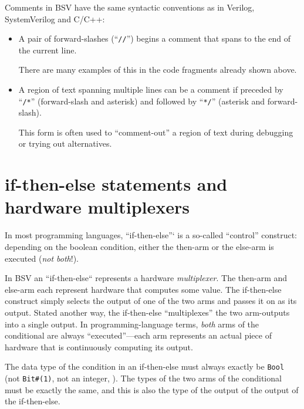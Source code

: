 Comments in BSV have the same syntactic conventions as in Verilog,
SystemVerilog and C/C++:

\begin{itemize}

  \item A pair of forward-slashes (``\verb|//|'') begins a comment
    that spans to the end of the current line.

    There are many examples of this in the code fragments already
    shown above.

  \item A region of text spanning multiple lines can be a comment if
    preceded by ``\verb|/*|'' (forward-slash and asterisk) and followed by
    ``\verb|*/|'' (asterisk and forward-slash).

    This form is often used to ``comment-out'' a region of text during
    debugging or trying out alternatives.

\end{itemize}


\section{if-then-else statements and hardware multiplexers}

\label{BSV_Combo_Circuits_if_then_else}


In most programming languages, ``if-then-else''` is a so-called
``control'' construct: depending on the boolean condition, either the
then-arm or the else-arm is executed (\emph{not both}!).

In BSV an ``if-then-else`` represents a hardware \emph{multiplexer}.
The then-arm and else-arm each represent hardware that computes some
value.  The if-then-else construct simply selects the output of one of
the two arms and passes it on as its output.  Stated another way, the
if-then-else ``multiplexes'' the two arm-outputs into a single output.
In programming-language terms, \emph{both} arms of the conditional are
always ``executed''---each arm represents an actual piece of hardware
that is continuously computing its output.

The data type of the condition in an if-then-else must always exactly
be \verb|Bool| (not \verb|Bit#(1)|, not an integer, {\etc}).  The
types of the two arms of the conditional must be exactly the same, and
this is also the type of the output of the output of the if-then-else.

